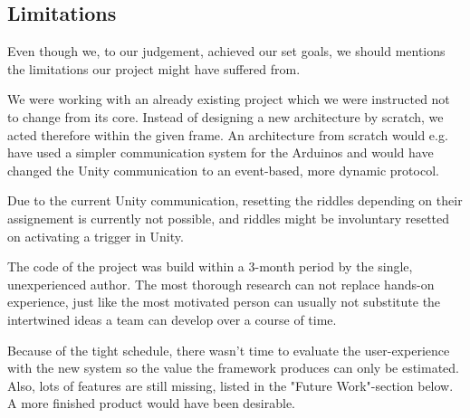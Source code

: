 \subsection{Limitations}
Even though we, to our judgement, achieved our set goals, 
we should mentions the limitations our project might have suffered from.

We were working with an already existing project which we were instructed not to change from its core. 
Instead of designing a new architecture by scratch, we acted therefore within the given frame. 
An architecture from scratch would e.g. have used a simpler communication system for the Arduinos and would have changed 
the Unity communication to an event-based, more dynamic protocol.  

Due to the current Unity communication, resetting the riddles depending on their assignement
is currently not possible, and riddles might be involuntary resetted on activating a trigger in Unity.

The code of the project was build within a 3-month period by the single, unexperienced author.
The most thorough research can not replace hands-on experience, 
just like the most motivated person can usually not substitute the intertwined ideas a team can develop over a course of time.

Because of the tight schedule, there wasn't time to evaluate the user-experience with the new system so the value the framework produces can only be estimated.
Also, lots of features are still missing, listed in the "Future Work"-section below.
A more finished product would have been desirable.


